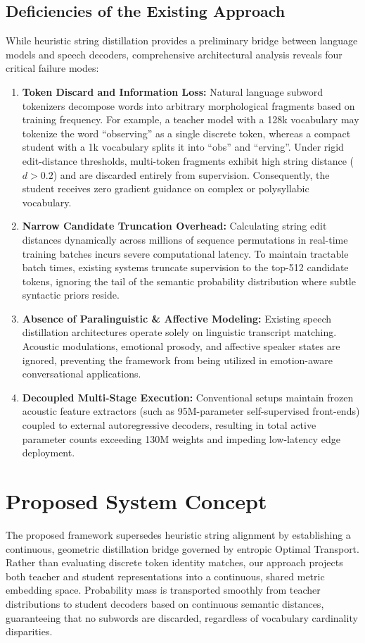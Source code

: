 \subsection{Deficiencies of the Existing Approach}
While heuristic string distillation provides a preliminary bridge between language models and speech decoders, comprehensive architectural analysis reveals four critical failure modes:
\begin{enumerate}
    \item \textbf{Token Discard and Information Loss:} Natural language subword tokenizers decompose words into arbitrary morphological fragments based on training frequency. For example, a teacher model with a 128k vocabulary may tokenize the word ``observing'' as a single discrete token, whereas a compact student with a 1k vocabulary splits it into ``obs'' and ``erving''. Under rigid edit-distance thresholds, multi-token fragments exhibit high string distance ($d > 0.2$) and are discarded entirely from supervision. Consequently, the student receives zero gradient guidance on complex or polysyllabic vocabulary.
    \item \textbf{Narrow Candidate Truncation Overhead:} Calculating string edit distances dynamically across millions of sequence permutations in real-time training batches incurs severe computational latency. To maintain tractable batch times, existing systems truncate supervision to the top-512 candidate tokens, ignoring the tail of the semantic probability distribution where subtle syntactic priors reside.
    \item \textbf{Absence of Paralinguistic & Affective Modeling:} Existing speech distillation architectures operate solely on linguistic transcript matching. Acoustic modulations, emotional prosody, and affective speaker states are ignored, preventing the framework from being utilized in emotion-aware conversational applications.
    \item \textbf{Decoupled Multi-Stage Execution:} Conventional setups maintain frozen acoustic feature extractors (such as 95M-parameter self-supervised front-ends) coupled to external autoregressive decoders, resulting in total active parameter counts exceeding 130M weights and impeding low-latency edge deployment.
\end{enumerate}

\section{Proposed System Concept}
The proposed framework supersedes heuristic string alignment by establishing a continuous, geometric distillation bridge governed by entropic Optimal Transport. Rather than evaluating discrete token identity matches, our approach projects both teacher and student representations into a continuous, shared metric embedding space. Probability mass is transported smoothly from teacher distributions to student decoders based on continuous semantic distances, guaranteeing that no subwords are discarded, regardless of vocabulary cardinality disparities.

